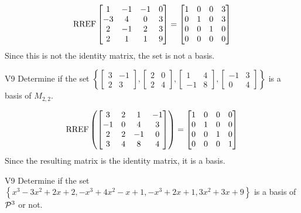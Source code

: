 \begin{solution}
\[\RREF \begin{bmatrix} 1 & -1 & -1 & 0 \\ -3 & 4 & 0 & 3 \\ 2 & -1 & 2 & 3 \\ 2 & 1 & 1 & 9 \end{bmatrix}=\begin{bmatrix} 1 &0 & 0 & 3 \\ 0 & 1 & 0 & 3 \\ 0 & 0 & 1 & 0 \\ 0 & 0 & 0 & 0 \end{bmatrix}\]
Since this is not the identity matrix, the set is not a basis.
\end{solution}
\begin{problem}{V9}
  Determine if the set \(\left\{
    \begin{bmatrix} 3 & -1 \\ 2 &3 \end{bmatrix},
    \begin{bmatrix} 2 & 0 \\ 2 & 4\end{bmatrix},
    \begin{bmatrix} 1 & 4 \\ -1 & 8\end{bmatrix},
    \begin{bmatrix} -1 & 3 \\ 0 & 4\end{bmatrix}
  \right\}\) is a basis of \(M_{2,2}\).
\end{problem}
\begin{solution}
  \[\RREF\left(
    \begin{bmatrix}
      3 & 2 & 1 & -1\\
      -1 & 0 & 4 & 3\\
      2 & 2 & -1 & 0\\
      3 & 4 & 8 & 4\\
    \end{bmatrix} \right)= \begin{bmatrix}
      1 & 0 & 0 & 0 \\
      0 & 1 & 0 & 0 \\
      0 & 0 & 1 & 0 \\
      0 & 0 & 0 & 1
    \end{bmatrix}
  \]
Since the resulting matrix is the identity matrix, it is a basis.
\end{solution}
\begin{problem}{V9}
Determine if the set \(\left\{ x^3-3x^2+2x+2, -x^3+4x^2-x+1, -x^3+2x+1, 3x^2+3x+9 \right\}\) is a basis of \(\P^3\) or not.
\end{problem}

